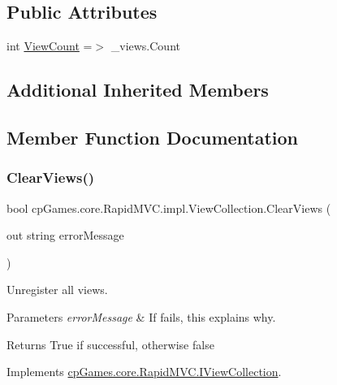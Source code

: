 \subsection*{Public Attributes}
\begin{DoxyCompactItemize}
\item 
int \mbox{\hyperlink{classcp_games_1_1core_1_1_rapid_m_v_c_1_1impl_1_1_view_collection_afb84f20b6b350eb1895cedc198b37efc}{View\+Count}} =$>$ \+\_\+views.\+Count
\end{DoxyCompactItemize}
\subsection*{Additional Inherited Members}


\subsection{Member Function Documentation}
\mbox{\label{classcp_games_1_1core_1_1_rapid_m_v_c_1_1impl_1_1_view_collection_a958ac198eae02d710e3abe17aed90205}} 
\subsubsection{\texorpdfstring{ClearViews()}{ClearViews()}}
{\footnotesize\ttfamily bool cp\+Games.\+core.\+Rapid\+M\+V\+C.\+impl.\+View\+Collection.\+Clear\+Views (\begin{DoxyParamCaption}\item[{out string}]{error\+Message }\end{DoxyParamCaption})}



Unregister all views. 


\begin{DoxyParams}{Parameters}
{\em error\+Message} & If fails, this explains why.\\
\hline
\end{DoxyParams}
\begin{DoxyReturn}{Returns}
True if successful, otherwise false
\end{DoxyReturn}


Implements \mbox{\hyperlink{interfacecp_games_1_1core_1_1_rapid_m_v_c_1_1_i_view_collection_ab7631908f42053edeb586ac79ffbb2c0}{cp\+Games.\+core.\+Rapid\+M\+V\+C.\+I\+View\+Collection}}.

